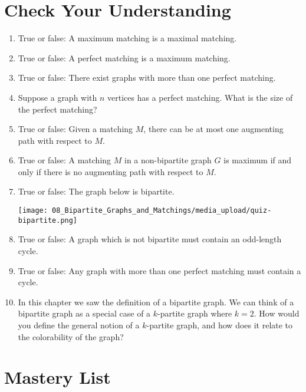 \section{Check Your Understanding}
\label{sec:matchings-in-graphs::check-your-understanding}

\begin{gram}
\label{grm:matchings-in-graphs::true}
\begin{enumerate}
    \item True or false: A maximum matching is a maximal matching.
    \item True or false: A perfect matching is a maximum matching.
    \item True or false: There exist graphs with more than one perfect matching.
    \item Suppose a graph with $n$ vertices has a perfect matching. What is the size of the perfect matching?
    \item True or false: Given a matching $M$, there can be at most one augmenting path with respect to $M$.
    \item True or false: A matching $M$ in a non-bipartite graph $G$ is maximum if and only if there is no augmenting path with respect to $M$.
    \item True or false: The graph below is bipartite.
    \begin{center}
        \texttt{[image: 08\_Bipartite\_Graphs\_and\_Matchings/media\_upload/quiz-bipartite.png]}
    \end{center}
    \item True or false: A graph which is not bipartite must contain an odd-length cycle.
    \item True or false: Any graph with more than one perfect matching must contain a cycle.
    \item In this chapter we saw the definition of a bipartite graph. We can think of a bipartite graph as a special case of a $k$-partite graph where $k = 2$. How would you define the general notion of a $k$-partite graph, and how does it relate to the colorability of the graph?
\end{enumerate}

\end{gram}


\section{Mastery List}
\label{sec:matchings-in-graphs::mastery-list}

